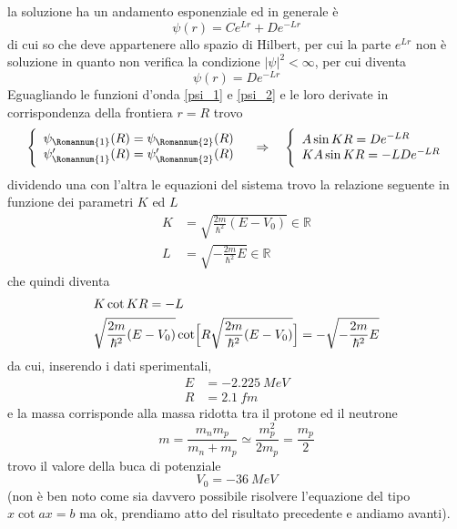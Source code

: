 la soluzione ha un andamento esponenziale ed in generale è
\begin{equation}
\psi(r) = C e^{L r} + D e^{- L r}
\end{equation}
di cui so che deve appartenere allo spazio di Hilbert, per cui la parte $e^{L r}$ non è soluzione in quanto non verifica la condizione $|\psi|^2 < \infty$, per cui diventa
\begin{equation}
\psi(r) = D e^{- L r} 
\label{psi_2}
\end{equation}
Eguagliando le funzioni d'onda \ref{psi_1} e \ref{psi_2} e le loro derivate in corrispondenza della frontiera $r = R$ trovo
\begin{equation}
\Bigg\{\begin{array}{l}
\psi_{\Romannum{1}}(R) = \psi_{\Romannum{2}}(R)\\
\psi_{\Romannum{1}}'(R) = \psi_{\Romannum{2}}'(R)
\end{array}
\quad\Rightarrow\quad 
\Bigg\{\begin{array}{l}
A \sin K R = D e^{ - L R }\\
K A \sin K R = -L D e^{ - L R }
\end{array}
\end{equation}
dividendo una con l'altra le equazioni del sistema trovo la relazione seguente in funzione dei parametri $K$ ed $L$
\begin{equation}
\begin{split}
K & = \sqrt{\frac{2m}{\hbar^2} (E - V_0)} \in \mathbb{R} \\
L & = \sqrt{- \frac{2m}{\hbar^2} E} \in \mathbb{R}
\end{split}
\end{equation}
che quindi diventa
\begin{equation}
\begin{split}
& K \cot K R = - L \\
& \sqrt{\frac{2m}{\hbar^2} (E - V_0)} \cot \Bigl[ R \sqrt{\frac{2m}{\hbar^2} (E - V_0)} \Bigr] = - \sqrt{- \frac{2m}{\hbar^2} E}
\end{split}
\end{equation}
da cui, inserendo i dati sperimentali, 
\begin{equation}
\begin{split}
E & = \SI{-2.225}{MeV} \\
R & = \SI{2.1}{fm}
\end{split}
\end{equation}
e la massa corrisponde alla massa ridotta tra il protone ed il neutrone
\begin{equation}
m = \frac{m_n m_p}{m_n + m_p} \simeq \frac{m_p^2}{2 m_p} = \frac{m_p}{2}
\end{equation}
trovo il valore della buca di potenziale
\begin{equation}
V_0 = \SI{-36}{MeV}
\end{equation}
(non è ben noto come sia davvero possibile risolvere l'equazione del tipo $x \cot a x = b$ ma ok, prendiamo atto del risultato precedente e andiamo avanti).

